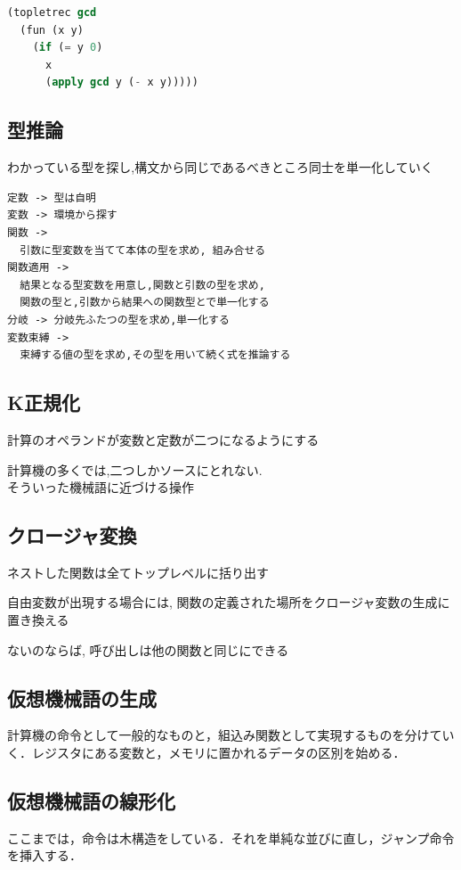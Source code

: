 \documentclass[papersize,30pt,slide]{jsarticle}
\begin{document}
\begin{lstlisting}[language=Lisp,columns=fullflexible,morekeywords={topletrec,fun,if},deletekeywords={gcd}]
(topletrec gcd
  (fun (x y)
    (if (= y 0)
      x
      (apply gcd y (- x y)))))
\end{lstlisting}

\newpage
\subsection{型推論}
わかっている型を探し,構文から同じであるべきところ同士を単一化していく
\begin{lstlisting}
定数 -> 型は自明
変数 -> 環境から探す
関数 ->
  引数に型変数を当てて本体の型を求め, 組み合せる
関数適用 ->
  結果となる型変数を用意し,関数と引数の型を求め,
  関数の型と,引数から結果への関数型とで単一化する
分岐 -> 分岐先ふたつの型を求め,単一化する
変数束縛 ->
  束縛する値の型を求め,その型を用いて続く式を推論する
\end{lstlisting}

\newpage
\subsection{K正規化}
計算のオペランドが変数と定数が二つになるようにする

計算機の多くでは,二つしかソースにとれない. \\
そういった機械語に近づける操作

\subsection{クロージャ変換}
ネストした関数は全てトップレベルに括り出す

自由変数が出現する場合には, 関数の定義された場所をクロージャ変数の生成に置き換える

ないのならば, 呼び出しは他の関数と同じにできる

\newpage

\subsection{仮想機械語の生成}
計算機の命令として一般的なものと，組込み関数として実現するものを分けてい
く．レジスタにある変数と，メモリに置かれるデータの区別を始める．

\subsection{仮想機械語の線形化}
ここまでは，命令は木構造をしている．それを単純な並びに直し，ジャンプ命令
を挿入する．
\end{document}
